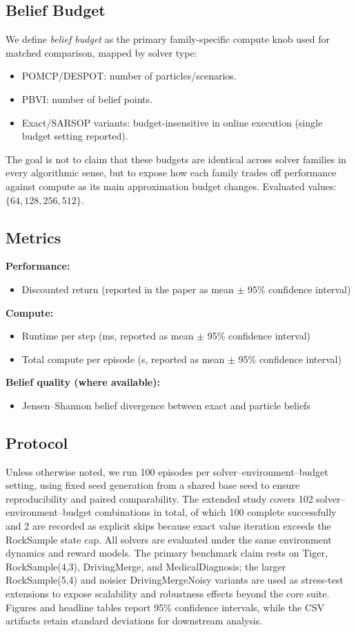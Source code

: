 \documentclass[10pt,twocolumn]{article}
\begin{document}
\subsection{Belief Budget}
We define \emph{belief budget} as the primary family-specific compute knob used for matched comparison, mapped by solver type:
\begin{itemize}
    \item POMCP/DESPOT: number of particles/scenarios.
    \item PBVI: number of belief points.
    \item Exact/SARSOP variants: budget-insensitive in online execution (single budget setting reported).
\end{itemize}
The goal is not to claim that these budgets are identical across solver families in every algorithmic sense, but to expose how each family trades off performance against compute as its main approximation budget changes. Evaluated values: $\{64,128,256,512\}$.

\subsection{Metrics}
\textbf{Performance:}
\begin{itemize}
    \item Discounted return (reported in the paper as mean $\pm$ 95\% confidence interval)
\end{itemize}
\textbf{Compute:}
\begin{itemize}
    \item Runtime per step (ms, reported as mean $\pm$ 95\% confidence interval)
    \item Total compute per episode (s, reported as mean $\pm$ 95\% confidence interval)
\end{itemize}
\textbf{Belief quality (where available):}
\begin{itemize}
    \item Jensen--Shannon belief divergence between exact and particle beliefs
\end{itemize}

\subsection{Protocol}
Unless otherwise noted, we run 100 episodes per solver--environment--budget setting, using fixed seed generation from a shared base seed to ensure reproducibility and paired comparability. The extended study covers 102 solver--environment--budget combinations in total, of which 100 complete successfully and 2 are recorded as explicit skips because exact value iteration exceeds the RockSample state cap. All solvers are evaluated under the same environment dynamics and reward models. The primary benchmark claim rests on Tiger, RockSample(4,3), DrivingMerge, and MedicalDiagnosis; the larger RockSample(5,4) and noisier DrivingMergeNoisy variants are used as stress-test extensions to expose scalability and robustness effects beyond the core suite. Figures and headline tables report 95\% confidence intervals, while the CSV artifacts retain standard deviations for downstream analysis.
\end{document}
